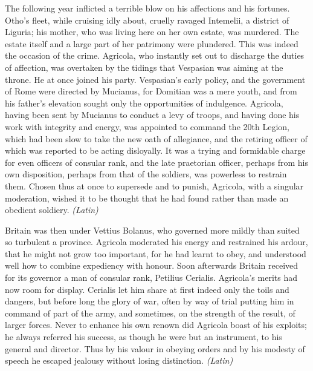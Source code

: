 
The following year inflicted a terrible blow on his affections and his fortunes. Otho's fleet, while cruising idly about, cruelly ravaged Intemelii, a district of Liguria; his mother, who was living here on her own estate, was murdered. The estate itself and a large part of her patrimony were plundered. This was indeed the occasion of the crime. Agricola, who instantly set out to discharge the duties of affection, was overtaken by the tidings that Vespasian was aiming at the throne. He at once joined his party. Vespasian's early policy, and the government of Rome were directed by Mucianus, for Domitian was a mere youth, and from his father's elevation sought only the opportunities of indulgence. Agricola, having been sent by Mucianus to conduct a levy of troops, and having done his work with integrity and energy, was appointed to command the 20th Legion, which had been slow to take the new oath of allegiance, and the retiring officer of which was reported to be acting disloyally. It was a trying and formidable charge for even officers of consular rank, and the late praetorian officer, perhaps from his own disposition, perhaps from that of the soldiers, was powerless to restrain them. Chosen thus at once to supersede and to punish, Agricola, with a singular moderation, wished it to be thought that he had found rather than made an obedient soldiery. \emph{(Latin)}


Britain was then under Vettius Bolanus, who governed more mildly than suited so turbulent a province. Agricola moderated his energy and restrained his ardour, that he might not grow too important, for he had learnt to obey, and understood well how to combine expediency with honour. Soon afterwards Britain received for its governor a man of consular rank, Petilius Cerialis. Agricola's merits had now room for display. Cerialis let him share at first indeed only the toils and dangers, but before long the glory of war, often by way of trial putting him in command of part of the army, and sometimes, on the strength of the result, of larger forces. Never to enhance his own renown did Agricola boast of his exploits; he always referred his success, as though he were but an instrument, to his general and director. Thus by his valour in obeying orders and by his modesty of speech he escaped jealousy without losing distinction. \emph{(Latin)}


